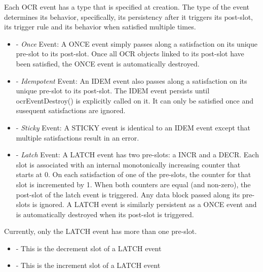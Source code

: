 Each OCR event has a type that is specified at creation.
The type of the event determines its behavior, specifically,
its persistency after it triggers its post-slot, its trigger rule and
its behavior when satisfied multiple times.

\begin{itemize}
\item {} - \emph{Once} Event: A ONCE event simply passes along a satisfaction on its
unique pre-slot to its post-slot. Once all OCR objects linked to its post-slot have been satisfied,
the ONCE event is automatically destroyed.
\item {} - \emph{Idempotent} Event: An IDEM event also passes along a satisfaction on its
unique pre-slot to its post-slot. The IDEM event persists until ocrEventDestroy() is explicitly called on it.
It can only be satisfied once and susequent satisfactions are ignored.
\item {} - \emph{Sticky} Event: A STICKY event is identical to an IDEM event except that
multiple satisfactions result in an error.
\item {} - \emph{Latch} Event: A LATCH event has two pre-slots: a INCR and a DECR.
Each slot is associated with an internal monotonically increasing counter that starts at 0.
On each satisfaction of one of the pre-slots, the counter for that slot is incremented by 1.
When both counters are equal (and non-zero), the post-slot of the latch event is triggered.
Any data block passed along its pre-slots is ignored. A LATCH event is similarly persistent
as a ONCE event and is automatically destroyed when its post-slot is triggered.
\end{itemize}

Currently, only the LATCH event has more than one pre-slot.
\begin{itemize}
\item {} - This is the decrement slot of a LATCH event
\item {} - This is the increment slot of a LATCH event
\end{itemize}

